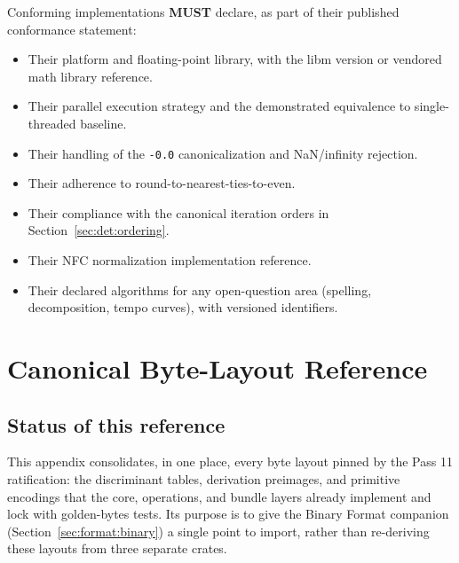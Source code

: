 \documentclass[11pt,letterpaper]{report}
\newcounter{requirement}[chapter]
\newcommand{\MUST}{\textbf{MUST}}
\begin{document}
\begin{requirement}
  \label{req:determinism:conformance-disclosure}
  Conforming implementations \MUST{} declare, as part of their
  published conformance statement:

  \begin{itemize}
    \item Their platform and floating-point library, with the
      libm version or vendored math library reference.
    \item Their parallel execution strategy and the demonstrated
      equivalence to single-threaded baseline.
    \item Their handling of the \texttt{-0.0} canonicalization
      and NaN/infinity rejection.
    \item Their adherence to round-to-nearest-ties-to-even.
    \item Their compliance with the canonical iteration orders
      in Section~\ref{sec:det:ordering}.
    \item Their NFC normalization implementation reference.
    \item Their declared algorithms for any open-question area
      (spelling, decomposition, tempo curves), with versioned
      identifiers.
  \end{itemize}
\end{requirement}

\chapter{Canonical Byte-Layout Reference}
\label{app:bytes}

\providecommand{\bul}{\_\discretionary{}{}{}}%
\providecommand{\cwb}{\discretionary{}{}{}}%

\section{Status of this reference}

This appendix consolidates, in one place, every byte layout pinned by
the Pass 11 ratification: the discriminant tables, derivation
preimages, and primitive encodings that the core, operations, and
bundle layers already implement and lock with golden-bytes tests. Its
purpose is to give the Binary Format companion
(Section~\ref{sec:format:binary}) a single point to import, rather than
re-deriving these layouts from three separate crates.
\end{document}
